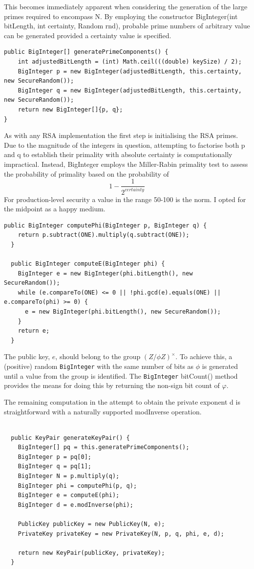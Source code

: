 \documentclass[]{final_report}
\theoremstyle{definition}
\begin{document}
This becomes immediately apparent when considering the generation of the large primes required to encompass N.
By employing the constructor BigInteger(int bitLength, int certainty, Random rnd), probable prime numbers of arbitrary value can be generated provided a certainty value is specified. 
\begin{lstlisting}[caption=Prime Generation with BigInteger]
public BigInteger[] generatePrimeComponents() {
    int adjustedBitLength = (int) Math.ceil(((double) keySize) / 2);
    BigInteger p = new BigInteger(adjustedBitLength, this.certainty, new SecureRandom());
    BigInteger q = new BigInteger(adjustedBitLength, this.certainty, new SecureRandom());
    return new BigInteger[]{p, q};
}
\end{lstlisting}
As with any RSA implementation the first step is initialising the RSA primes. 
Due to the magnitude of the integers in question, attempting to factorise both p and q to establish their primality with absolute certainty is computationally impractical. Instead, BigInteger employs the Miller-Rabin primality test to assess the probability of primality based on the probability of \[ 1 - \frac{1}{2^{certainty}}\]
For production-level security a value in the range 50-100 is the norm. I opted for the midpoint as a happy medium.

\begin{lstlisting}[caption=Key components]
  public BigInteger computePhi(BigInteger p, BigInteger q) {
    return p.subtract(ONE).multiply(q.subtract(ONE));
  }
  
  public BigInteger computeE(BigInteger phi) {
    BigInteger e = new BigInteger(phi.bitLength(), new SecureRandom());
    while (e.compareTo(ONE) <= 0 || !phi.gcd(e).equals(ONE) || e.compareTo(phi) >= 0) {
      e = new BigInteger(phi.bitLength(), new SecureRandom());
    }
    return e;
  }
\end{lstlisting}
The public key, \( e \), should belong to the group \( (Z/\phi Z)^{\times} \). To achieve this, a (positive) random \texttt{BigInteger} with the same number of bits as \( \phi \) is generated until a value from the group is identified. The \texttt{BigInteger} bitCount() method provides the means for doing this by returning the non-sign bit count of $\varphi$. 

The remaining computation in the attempt to obtain the private exponent d is straightforward with a naturally supported modInverse operation.
\begin{lstlisting}[caption=Java Implementation of Key Generation (\ref{subSec:keygen})]
  
  public KeyPair generateKeyPair() {
    BigInteger[] pq = this.generatePrimeComponents();
    BigInteger p = pq[0];
    BigInteger q = pq[1];
    BigInteger N = p.multiply(q);
    BigInteger phi = computePhi(p, q);
    BigInteger e = computeE(phi);
    BigInteger d = e.modInverse(phi);

    PublicKey publicKey = new PublicKey(N, e);
    PrivateKey privateKey = new PrivateKey(N, p, q, phi, e, d);

    return new KeyPair(publicKey, privateKey);
  }

\end{lstlisting}
\end{document}
